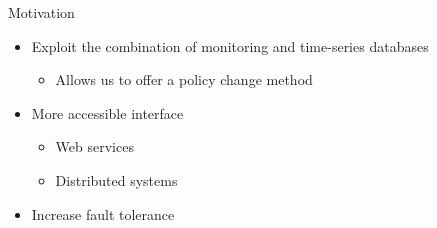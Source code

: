 \begin{frame}{Motivation}
    \begin{itemize}
        \item Exploit the combination of monitoring and time-series databases
        \begin{itemize}
            \item Allows us to offer a policy change method
        \end{itemize}
        \item More accessible interface
        \begin{itemize}
            \item Web services
            \item Distributed systems
        \end{itemize}
        \item Increase fault tolerance
    \end{itemize}
    
\end{frame}